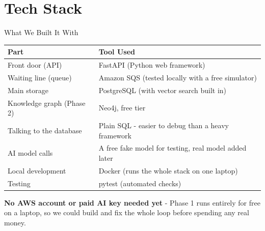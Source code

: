 \documentclass{beamer}
\begin{document}
\section{Tech Stack}
\begin{frame}{What We Built It With}
\begin{table}[h]
    \centering
    \small
    \begin{tabular}{ll}
        \toprule
        \textbf{Part} & \textbf{Tool Used} \\
        \midrule
        Front door (API) & FastAPI (Python web framework) \\
        Waiting line (queue) & Amazon SQS (tested locally with a free simulator) \\
        Main storage & PostgreSQL (with vector search built in) \\
        Knowledge graph (Phase 2) & Neo4j, free tier \\
        Talking to the database & Plain SQL - easier to debug than a heavy framework \\
        AI model calls & A free fake model for testing, real model added later \\
        Local development & Docker (runs the whole stack on one laptop) \\
        Testing & pytest (automated checks) \\
        \bottomrule
    \end{tabular}
\end{table}
\vspace{0.15cm}
\footnotesize
\textbf{No AWS account or paid AI key needed yet} - Phase 1 runs entirely for free on a laptop, so we could build and fix the whole loop before spending any real money.
\end{frame}

\end{document}

